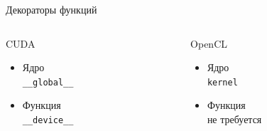 \documentclass[@BEAMER_OPTIONS@]{beamer}
\newcommand{\code}[1]{\lstinline|#1|}
\begin{document}
\begin{frame}[fragile]{Декораторы функций}
    \begin{columns}
        \begin{column}{0.48\textwidth}
            \begin{block}{CUDA}
                \begin{itemize}
                    \item<1-> Ядро\\
                        \code{__global__}
                    \item<2-> Функция\\
                        \code{__device__}
                \end{itemize}
            \end{block}
        \end{column}
        \begin{column}{0.48\textwidth}
            \begin{block}{OpenCL}
                \begin{itemize}
                    \item<1-> Ядро\\
                        \code{kernel}
                    \item<2-> Функция\\
                        не требуется
                \end{itemize}
            \end{block}
        \end{column}
    \end{columns}
\end{frame}
\end{document}
